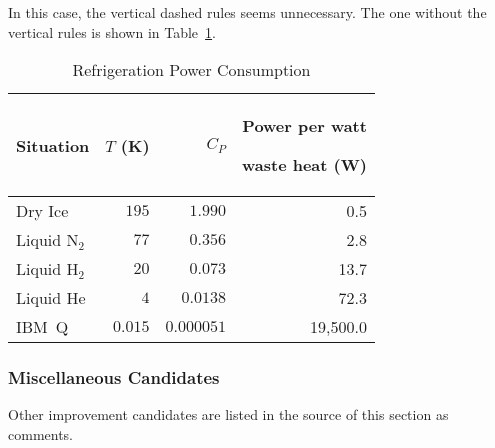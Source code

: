 In this case, the vertical dashed rules seems unnecessary.
The one without the vertical rules is shown in
Table~\ref{tab:app:styleguide:Refrigeration Power Consumption (arydshln-2)}.

\begin{table}[H]
\renewcommand*{\arraystretch}{1.2}\centering\small
\begin{tabular}{lrrr}\toprule
Situation
	& $T$ (K)
		& $C_P$	& \parbox[b]{.75in}{\raggedleft Power per watt\par waste heat (W)} \\
\midrule
Dry Ice
	& $195$
		& $1.990$
			& 0.5 \\ \hdashline
Liquid N$_2$
	& $77$
		& $0.356$
			& 2.8 \\ \hdashline
Liquid H$_2$
	& $20$
		& $0.073$
			& 13.7 \\ \hdashline
Liquid He
	& $4$
		& $0.0138$
			& 72.3 \\ \hdashline
IBM~Q	& $0.015$
		& $0.000051$
			& 19,500.0 \\
\bottomrule
\end{tabular}
\caption{Refrigeration Power Consumption}
\label{tab:app:styleguide:Refrigeration Power Consumption (arydshln-2)}
\end{table}

\captionsetup[table]{position=bottom,hangindent=0pt}
\renewcommand*{\abovetopsep}{0pt}

\subsubsection{Miscellaneous Candidates}
\label{sec:app:styleguide:Miscellaneous Candidates}

Other improvement candidates are listed in the source of this
section as comments.

%
%
%
%
%
%
